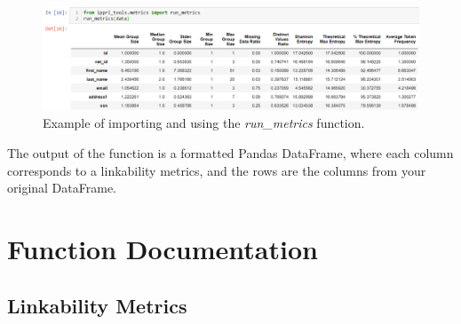 \documentclass[titlepage, 11pt]{article}
\begin{document}
\begin{figure}[H]
    \centering
    \includegraphics[width=\textwidth]{imgs/RunMetricsExample.PNG}
    \caption{Example of importing and using the \textit{run\_metrics} function.}
    \label{fig:run_metrics}
\end{figure}

\noindent The output of the function is a formatted Pandas DataFrame, where each column corresponds to a linkability metrics, and the rows are the columns from your original DataFrame.

\section{Function Documentation}



\newcommand{\parmdesc}[2]{\textit{#1} - #2}

\newcommand{\docdata}{\parmdesc{data}{The Pandas DataFrame to be modified. Please ensure that your data is in the correct format (as specified in Section \ref{data_prereqs}) before passing as an argument.}}

\newcommand{\doccols}{\parmdesc{columns}{An optional list of columns to operate on. These columns should correspond to column names in the DataFrame that you would like to calculate metrics for. The default argument (\textit{columns=None}) will calculate metrics for each column in \textit{data}.}}

\newcommand{\docreturn}[1]{\parmdesc{values}{A dictionary containing a key/value mapping of \textit{column\_name} $\rightarrow$ \textit{#1} for each column specified in \textit{columns}.}} 

\subsection{Linkability Metrics}
\end{document}
